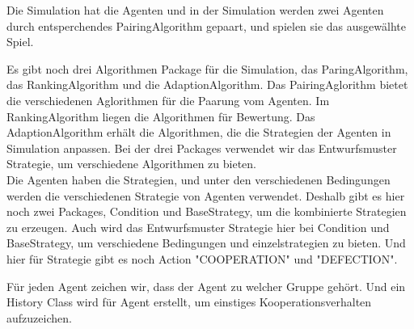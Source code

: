 Die Simulation hat die Agenten und in der Simulation werden zwei Agenten durch entsperchendes PairingAlgorithm gepaart, und spielen sie das ausgewälhte Spiel.

Es gibt noch drei Algorithmen Package für die Simulation, das ParingAlgorithm, das RankingAlgorithm und die AdaptionAlgorithm. Das PairingAglorithm bietet die verschiedenen Aglorithmen für die Paarung vom Agenten. Im RankingAlgorithm liegen die Algorithmen für Bewertung. Das AdaptionAlgorithm erhält die Algorithmen, die die Strategien der Agenten in Simulation anpassen. Bei der drei Packages verwendet wir das Entwurfsmuster Strategie, um verschiedene Algorithmen zu bieten.\\

Die Agenten haben die Strategien, und unter den verschiedenen Bedingungen werden die verschiedenen Strategie von Agenten verwendet. Deshalb gibt es hier noch zwei Packages, Condition und BaseStrategy, um die kombinierte Strategien zu erzeugen. Auch wird das Entwurfsmuster Strategie hier bei Condition und BaseStrategy, um verschiedene Bedingungen und einzelstrategien zu bieten. Und hier für Strategie gibt es noch Action "COOPERATION" und "DEFECTION".

Für jeden Agent zeichen wir, dass der Agent zu welcher Gruppe gehört. Und ein History Class wird für Agent erstellt, um einstiges Kooperationsverhalten aufzuzeichen.
